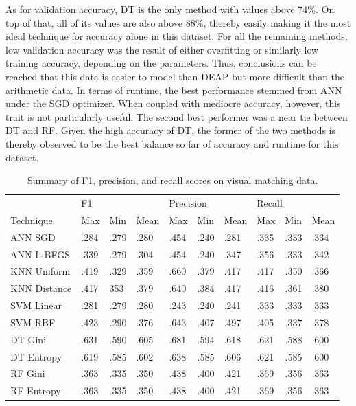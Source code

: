\documentclass[12pt]{uthesis-v12}  %
\begin{document}
As for validation accuracy, DT is the only method with values above 74\%. On top of that, all of its values are also above 88\%, thereby easily making it the most ideal technique for accuracy alone in this dataset. For all the remaining methods, low validation accuracy was the result of either overfitting or similarly low training accuracy, depending on the parameters. Thus, conclusions can be reached that this data is easier to model than DEAP but more difficult than the arithmetic data. In terms of runtime, the best performance stemmed from ANN under the SGD optimizer. When coupled with mediocre accuracy, however, this trait is not particularly useful. The second best performer was a near tie between DT and RF. Given the high accuracy of DT, the former of the two methods is thereby observed to be the best balance so far of accuracy and runtime for this dataset.

\begin{table}[!t]
\caption{Summary of F1, precision, and recall scores on visual matching data.}
\renewcommand{\arraystretch}{1.3}
\centering
{\begin{tabular}{*{10}{l}}
\toprule
& \multicolumn{3}{l}{F1} & \multicolumn{3}{l}{Precision} & \multicolumn{3}{l}{Recall} \\
Technique & Max & Min & Mean & Max & Min & Mean & Max & Min & Mean \\ \midrule
ANN SGD & .284 & .279 & .280 & .454 & .240 & .281 & .335 & .333 & .334 \\
ANN L-BFGS & .339 & .279 & .304 & .454 & .240 & .347 & .356 & .333 & .342 \\
KNN Uniform & .419 & .329 & .359 & .660 & .379 & .417 & .417 & .350 & .366 \\
KNN Distance & .417 & 353 & .379 & .640 & .384 & .417 & .416 & .361 & .380 \\
SVM Linear & .281 & .279 & .280 & .243 & .240 & .241 & .333 & .333 & .333 \\
SVM RBF & .423 & .290 & .376 & .643 & .407 & .497 & .405 & .337 & .378 \\
DT Gini & .631 & .590 & .605 & .681 & .594 & .618 & .621 & .588 & .600 \\
DT Entropy & .619 & .585 & .602 & .638 & .585 & .606 & .621 & .585 & .600 \\
RF Gini & .363 & .335 & .350 & .438 & .400 & .421 & .369 & .356 & .363 \\
RF Entropy & .363 & .335 & .350 & .438 & .400 & .421 & .369 & .356 & .363 \\ \bottomrule
\end{tabular}}

\label{fpr-vismatch}
\end{table}
\end{document}
